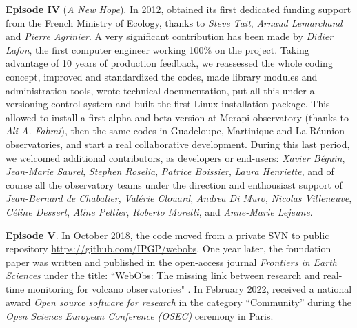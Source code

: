 \textbf{Episode IV} (\textit{A New Hope}). In 2012, \webobs obtained its first dedicated funding support from the French Ministry of Ecology, thanks to \textit{Steve Tait}, \textit{Arnaud Lemarchand} and \textit{Pierre Agrinier}. A very significant contribution has been made by \textit{Didier Lafon}, the first computer engineer working 100\% on the project. Taking advantage of 10 years of production feedback, we reassessed the whole coding concept, improved and standardized the codes, made library modules and administration tools, wrote technical documentation, put all this under a versioning control system and built the first Linux installation package. This allowed to install a first alpha and beta version at Merapi observatory (thanks to \textit{Ali A. Fahmi}), then the same codes in Guadeloupe, Martinique and La Réunion observatories, and start a real collaborative development. During this last period, we welcomed additional contributors, as developers or end-users: \textit{Xavier Béguin}, \textit{Jean-Marie Saurel}, \textit{Stephen Roselia}, \textit{Patrice Boissier}, \textit{Laura Henriette}, and of course all the observatory teams under the direction and enthousiast support of \textit{Jean-Bernard de Chabalier}, \textit{Valérie Clouard}, \textit{Andrea Di Muro}, \textit{Nicolas Villeneuve}, \textit{Céline Dessert}, \textit{Aline Peltier}, \textit{Roberto Moretti}, and \textit{Anne-Marie Lejeune}.

\textbf{Episode V}. In October 2018, the \webobs code moved from a private SVN to public repository \url{https://github.com/IPGP/webobs}. One year later, the foundation paper was written and published in the open-access journal \textit{Frontiers in Earth Sciences} under the title: “WebObs: The missing link between research and real-time monitoring for volcano observatories" \citep{beauducel2020webobs}. In February 2022, \webobs received a national award {\it Open source software for research} in the category “Community” during the {\it Open Science European Conference (OSEC)} ceremony in Paris.